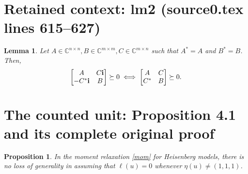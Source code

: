 \documentclass[10pt,a4paper]{amsart}
\def\C{{\mathbb{C}}}
\def\bi{\hbox{\bf{i}}}
\theoremstyle{plain}
\newtheorem{proposition}[theorem]{Proposition}
\newtheorem{lemma}[theorem]{Lemma}
\theoremstyle{definition}
\theoremstyle{remark}
\begin{document}
\section*{Retained context: lm2 (source0.tex lines 615--627)}

\begin{lemma}\label{lm2}
Let $A\in\C^{n\times n}, B\in\C^{m\times m}, C\in\C^{m\times n}$ such that $A^*=A$ and $B^*=B$. Then,
\begin{equation}
\begin{bmatrix}
A&C\bi\\
-C^{*}\bi&B
\end{bmatrix}\succeq0\iff
\begin{bmatrix}
A&C\\
C^{*}&B
\end{bmatrix}\succeq0.
\end{equation}
\end{lemma}


\section{The counted unit: Proposition 4.1 and its complete original proof}

\begin{proposition}\label{prop2}
In the moment relaxation \eqref{mom} for Heisenberg models, there is no loss of generality in assuming that $\ell(u)=0$ whenever $\eta(u)\ne(1,1,1)$.
\end{proposition}
\end{document}
